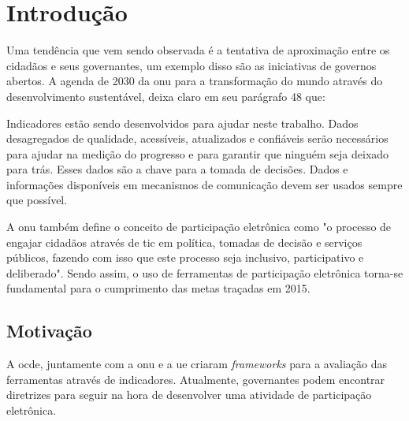 \chapter[Introdução]{Introdução}
\label{cap:cap1}
\par
Uma tendência que vem sendo observada é a tentativa de aproximação entre os cidadãos e seus governantes, um exemplo disso são as iniciativas de governos abertos.
A agenda de 2030 da \acrfull{onu} para a transformação do mundo através do desenvolvimento sustentável, deixa claro em seu parágrafo 48 que:

\hspace{4cm}
\begin{minipage}{.66\textwidth}		
    \begin{singlespace}
        \fontsize{10}{12}\selectfont Indicadores estão sendo desenvolvidos para ajudar neste trabalho. Dados desagregados de qualidade, acessíveis, 
        atualizados e confiáveis serão necessários para ajudar na medição do progresso e para garantir que ninguém seja deixado para trás. 
        Esses dados são a chave para a tomada de decisões. Dados e informações disponíveis em mecanismos de comunicação devem ser usados sempre que possível.
        \cite{assembly2015transforming}
        \end{singlespace}
\end{minipage}
\vspace{0.3CM}

A \acrshort{onu} também define o conceito de participação eletrônica como "o processo de engajar cidadãos através de \acrfull{tic} em política, tomadas de decisão e
serviços públicos, fazendo com isso que este processo seja inclusivo, participativo e deliberado". Sendo assim, o uso de ferramentas de participação eletrônica torna-se
fundamental para o cumprimento das metas traçadas em 2015. 

\section{Motivação}
\label{sec:motivacao}
\par
A \acrfull{ocde}, juntamente com a \acrshort{onu} e a \acrfull{ue} criaram \textit{frameworks} para a avaliação das ferramentas através de indicadores. 
Atualmente, governantes podem encontrar diretrizes para seguir na hora de desenvolver uma atividade de participação eletrônica.

